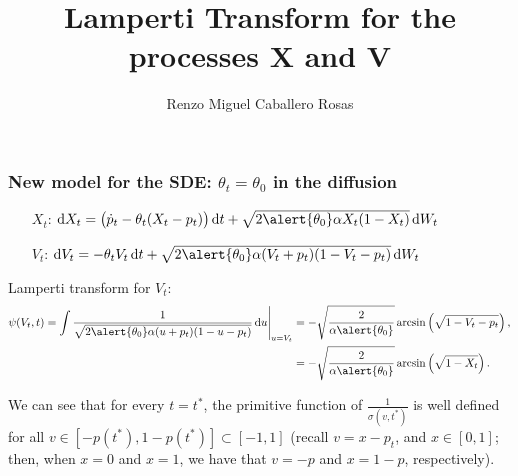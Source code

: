 \documentclass[aspectratio=169]{beamer}\usepackage[utf8]{inputenc}
\title{Lamperti Transform for the processes X and V}
\subtitle{Renzo Miguel Caballero Rosas}
\begin{document}
\begin{frame}
\titlepage
\end{frame}


\begin{frame}\frametitle{New model for the SDE: $\theta_t=\theta_0$ in the diffusion}

\begin{enumerate}

\item[$X_t$:] $\dif X_t=\left(\dot p_t-\theta_t(X_t-p_t)\right)\dif t+\sqrt{2\alert{\theta_0}\alpha X_t(1-X_t)}\dif W_t$
\item[$V_t$:] $\dif V_t=-\theta_tV_t\dif t+\sqrt{2\alert{\theta_0}\alpha(V_t+p_t)(1-V_t-p_t)}\dif W_t$

\end{enumerate}
Lamperti transform for $V_t$:
\begin{equation*}
\begin{split}
\psi(V_t,t)=\int\frac{1}{\sqrt{2\alert{\theta_0}\alpha(u+p_t)(1-u-p_t)}}\dif u\Bigg|_{u=V_t}&=-\sqrt{\frac{2}{\alpha\alert{\theta_0}}}\arcsin\left(\sqrt{1-V_t-p_t}\right),\\
&=-\sqrt{\frac{2}{\alpha\alert{\theta_0}}}\arcsin\left(\sqrt{1-X_t}\right).
\end{split}
\end{equation*}

We can see that for every $t=t^*$, the primitive function of $\frac{1}{\sigma(v,t^*)}$ is well defined for all $v\in\left[-p(t^*),1-p(t^*)\right]\subset[-1,1]$ (recall $v=x-p_t$, and $x\in[0,1]$; then, when $x=0$ and $x=1$, we have that $v=-p$ and $x=1-p$, respectively).

\end{frame}
\end{document}

